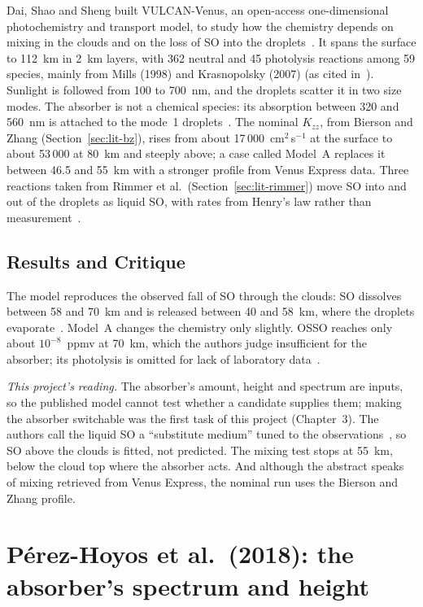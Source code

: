 Dai, Shao and Sheng built VULCAN-Venus, an open-access one-dimensional photochemistry and
transport model, to study how the chemistry depends on mixing in the clouds and on the
loss of SO into the droplets~\cite{dai2024}. It spans the surface to 112~km in
2~km layers, with 362 neutral and 45 photolysis reactions among 59 species, mainly from
Mills (1998) and Krasnopolsky (2007) (as cited in~\cite{dai2024}). Sunlight is followed
from 100 to 700~nm, and the droplets scatter it in two size modes. The absorber is not a
chemical species: its absorption between 320 and 560~nm is attached to the mode~1
droplets~\cite{dai2024}. The nominal $K_{zz}$, from Bierson and Zhang
(Section~\ref{sec:lit-bz}), rises from about 17\,000~cm$^{2}$\,s$^{-1}$ at the surface to
about 53\,000 at 80~km and steeply above; a case called Model~A replaces it between 46.5
and 55~km with a stronger profile from Venus Express data. Three reactions taken from
Rimmer et al.\ (Section~\ref{sec:lit-rimmer}) move SO into and out of the droplets
as liquid SO, with rates from Henry's law rather than measurement~\cite{dai2024}.

\subsection{Results and Critique}

The model reproduces the observed fall of SO through the clouds: SO
dissolves between 58 and 70~km and is released between 40 and 58~km, where the droplets
evaporate~\cite{dai2024}. Model~A changes the chemistry only slightly. OSSO reaches only
about $10^{-8}$~ppmv at 70~km, which the authors judge insufficient for the absorber; its
photolysis is omitted for lack of laboratory data~\cite{dai2024}.

\emph{This project's reading.} The absorber's amount, height and spectrum are inputs, so
the published model cannot test whether a candidate supplies them; making the absorber
switchable was the first task of this project (Chapter~3). The authors call the liquid
SO a ``substitute medium'' tuned to the observations~\cite{dai2024}, so SO
above the clouds is fitted, not predicted. The mixing test stops at 55~km, below the
cloud top where the absorber acts. And although the abstract speaks of mixing retrieved
from Venus Express, the nominal run uses the Bierson and Zhang profile.

\section{P\'erez-Hoyos et al.\ (2018): the absorber's spectrum and height}
\label{sec:lit-ph}

